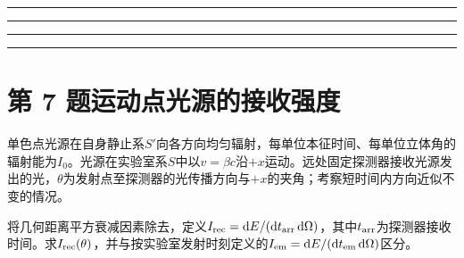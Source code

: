 \documentclass[UTF8,fontset=fandol,a4paper,11pt]{ctexart}
\newcommand{\dd}{\mathop{}\!\mathrm{d}}
\newcommand{\workarea}{\par\vspace{7mm}\noindent{\small\color{muted}作答区}\par\vspace{4mm}
\noindent\textcolor{rulegray}{\rule{\linewidth}{0.3pt}}\par\vspace{16mm}
\noindent\textcolor{rulegray}{\rule{\linewidth}{0.3pt}}\par\vspace{16mm}
\noindent\textcolor{rulegray}{\rule{\linewidth}{0.3pt}}\par\vspace{16mm}
\noindent\textcolor{rulegray}{\rule{\linewidth}{0.3pt}}}
\begin{document}
\workarea

\clearpage


\section*{第 7 题\quad 运动点光源的接收强度}\label{q:7}

单色点光源在自身静止系$S'$向各方向均匀辐射，每单位本征时间、每单位立体角的辐射能为$I_0$。光源在实验室系$S$中以$v=\beta c$沿$+x$运动。远处固定探测器接收光源发出的光，$\theta$为发射点至探测器的光传播方向与$+x$的夹角；考察短时间内方向近似不变的情况。

将几何距离平方衰减因素除去，定义$I_{\rm rec}=\dd E/(\dd t_{\rm arr}\dd\Omega)$，其中$t_{\rm arr}$为探测器接收时间。求$I_{\rm rec}(\theta)$，并与按实验室发射时刻定义的$I_{\rm em}=\dd E/(\dd t_{\rm em}\dd\Omega)$区分。
\end{document}
